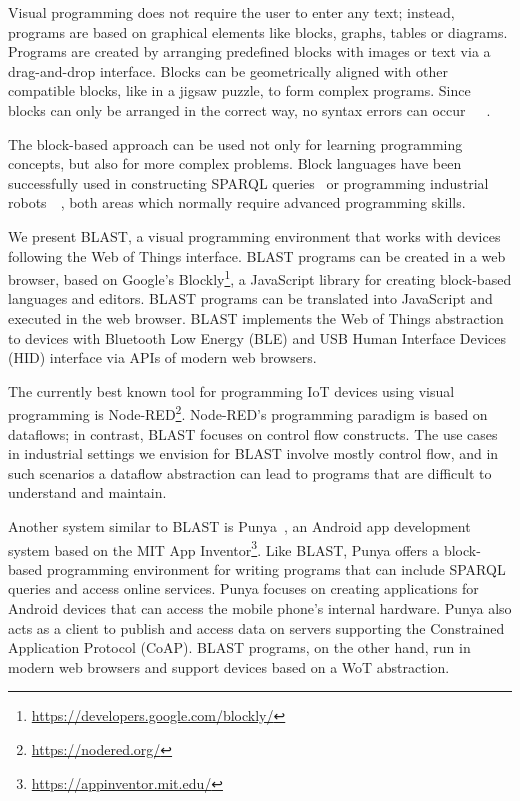 \documentclass[runningheads]{llncs}
\begin{document}
Visual programming does not require the user to enter any text; instead, programs are based on graphical elements like blocks, graphs, tables or diagrams.
Programs are created by arranging predefined blocks with images or text via a drag-and-drop interface.
Blocks can be geometrically aligned with other compatible blocks, like in a jigsaw puzzle, to form complex programs.
Since blocks can only be arranged in the correct way, no syntax errors can occur~\cite{10.1145/1089733.1089734}~\cite{maloney2010scratch}~\cite{10.11453341221}.

The block-based approach can be used not only for learning programming concepts, but also for more complex problems.
Block languages have been successfully used in constructing SPARQL queries~\cite{7369012} or programming industrial robots~\cite{tomlein2017visual}~\cite{8120406}, both areas which normally require advanced programming skills.

We present BLAST, a visual programming environment that works with devices following the Web of Things interface.
BLAST programs can be created in a web browser, based on Google's Blockly\footnote{\url{https://developers.google.com/blockly/}}, a JavaScript library for creating block-based languages and editors.
BLAST programs can be translated into JavaScript and executed in the web browser.
BLAST implements the Web of Things abstraction to devices with Bluetooth Low Energy (BLE) and USB Human Interface Devices (HID) interface via APIs of modern web browsers.

The currently best known tool for programming IoT devices using visual programming is Node-RED\footnote{\url{https://nodered.org/}}.
Node-RED's programming paradigm is based on dataflows; in contrast, BLAST focuses on control flow constructs.
The use cases in industrial settings we envision for BLAST involve mostly control flow, and in such scenarios a dataflow abstraction can lead to programs that are difficult to understand and maintain.

Another system similar to BLAST is Punya~\cite{patton2021punya}, an Android app development system based on the MIT App Inventor\footnote{\url{https://appinventor.mit.edu/}}.
Like BLAST, Punya offers a block-based programming environment for writing programs that can include SPARQL queries and access online services.
Punya focuses on creating applications for Android devices that can access the mobile phone's internal hardware.
Punya also acts as a client to publish and access data on servers supporting the Constrained Application Protocol (CoAP).
BLAST programs, on the other hand, run in modern web browsers and support devices based on a WoT abstraction.
\end{document}

